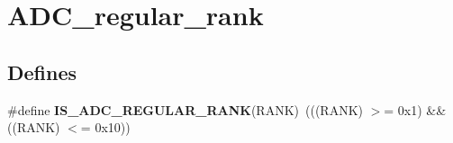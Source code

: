\hypertarget{group__ADC__regular__rank}{
\section{ADC\_\-regular\_\-rank}
\label{group__ADC__regular__rank}
}
\subsection*{Defines}
\begin{DoxyCompactItemize}
\item 
\hypertarget{group__ADC__regular__rank_ga5928a1e9315f798e27220b91f1bae7f2}{
\#define {\bfseries IS\_\-ADC\_\-REGULAR\_\-RANK}(RANK)~(((RANK) $>$= 0x1) \&\& ((RANK) $<$= 0x10))}
\label{group__ADC__regular__rank_ga5928a1e9315f798e27220b91f1bae7f2}

\end{DoxyCompactItemize}
